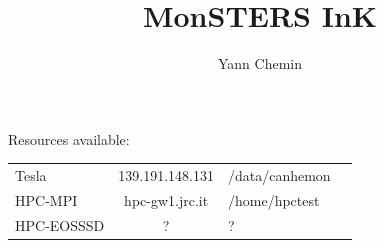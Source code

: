 \documentclass[serif,mathserif,aspectratio=169]{beamer}
\title[JRC\hspace{2em}\insertframenumber/\inserttotalframenumber]{MonSTERS InK}
\author[Yann Chemin]{Yann Chemin }
\institute{JRC}
\date{} %
\begin{document}
{
\begin{frame}[plain]
\titlepage
\end{frame}}

\Large


\begin{frame}
 Resources available:
  
\begin{table}
\begin{tabular}{lclc}
 Tesla & 139.191.148.131 & /data/canhemon\\
 HPC-MPI & hpc-gw1.jrc.it & /home/hpctest\\
 HPC-EOSSSD & ? & ?\\
 \end{tabular}
\end{table}

\end{frame}

\end{document}
